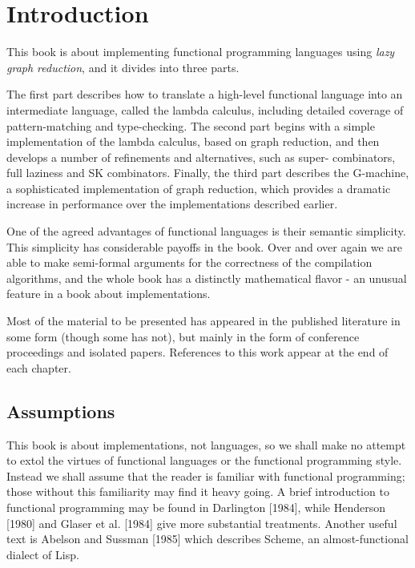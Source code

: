 \chapter{Introduction}

This book is about implementing functional programming languages using
\textit{lazy graph reduction}, and it divides into three parts.

The first part describes how to translate a high-level functional language
into an intermediate language, called the lambda calculus, including detailed
coverage of pattern-matching and type-checking. The second part begins with
a simple implementation of the lambda calculus, based on graph reduction,
and then develops a number of refinements and alternatives, such as super-
combinators, full laziness and SK combinators. Finally, the third part
describes the G-machine, a sophisticated implementation of graph reduction,
which provides a dramatic increase in performance over the implementations
described earlier.

One of the agreed advantages of functional languages is their semantic
simplicity. This simplicity has considerable payoffs in the book. Over and
over again we are able to make semi-formal arguments for the correctness of
the compilation algorithms, and the whole book has a distinctly mathematical
flavor - an unusual feature in a book about implementations.

Most of the material to be presented has appeared in the published
literature in some form (though some has not), but mainly in the form of
conference proceedings and isolated papers. References to this work appear
at the end of each chapter.

\section{Assumptions}
This book is about implementations, not languages, so we shall make no
attempt to extol the virtues of functional languages or the functional
programming style. Instead we shall assume that the reader is familiar with
functional programming; those without this familiarity may find it heavy
going. A brief introduction to functional programming may be found in
Darlington [1984], while Henderson [1980] and Glaser et al. [1984] give more
substantial treatments. Another useful text is Abelson and Sussman [1985]
which describes Scheme, an almost-functional dialect of Lisp.

